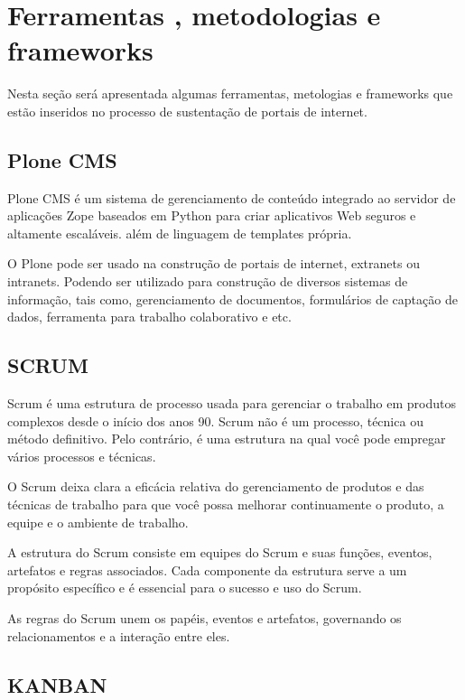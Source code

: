 \section{Ferramentas , metodologias e frameworks} \label{ses:intro}

Nesta seção será apresentada algumas ferramentas, metologias e frameworks que estão inseridos no processo de sustentação de portais de internet.

\subsection{Plone CMS}

Plone CMS é um sistema de gerenciamento de conteúdo integrado ao servidor de aplicações Zope \cite{ZopeF} baseados em Python para criar aplicativos Web seguros e altamente escaláveis. além de linguagem de templates própria. \cite{PloneCMS}

O Plone pode ser usado na  construção de portais de internet, extranets ou intranets. Podendo ser utilizado para construção de diversos sistemas de informação, tais como, gerenciamento de documentos, formulários de captação de dados, ferramenta para trabalho colaborativo e etc. 

\subsection{SCRUM}

Scrum é uma estrutura de processo usada para gerenciar o trabalho em produtos complexos desde o início dos anos 90. Scrum não é um processo, técnica ou método definitivo. Pelo contrário, é uma estrutura na qual você pode empregar vários processos e técnicas. \cite{Scrum}

O Scrum deixa clara a eficácia relativa do gerenciamento de produtos e das técnicas de trabalho para que você possa melhorar continuamente o produto, a equipe e o ambiente de trabalho.

A estrutura do Scrum consiste em equipes do Scrum e suas funções, eventos, artefatos e regras associados. Cada componente da estrutura serve a um propósito específico e é essencial para o sucesso e uso do Scrum.

As regras do Scrum unem os papéis, eventos e artefatos, governando os relacionamentos e a interação entre eles.

\subsection{KANBAN}

